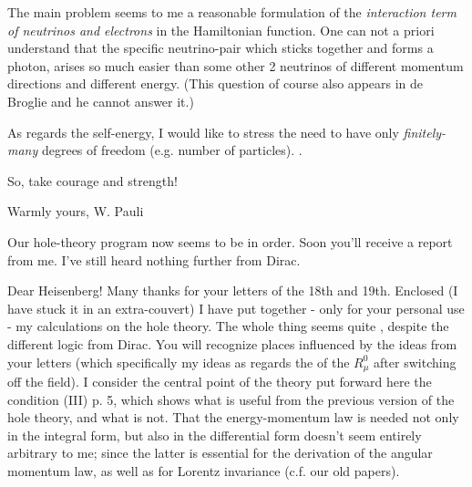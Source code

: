 \documentclass{article}
\begin{document}
The main problem seems to me  a reasonable formulation of the \textit{interaction term of neutrinos and electrons} in the Hamiltonian function. One can not a priori understand that the specific neutrino-pair which sticks together and forms a photon, arises so much easier than some other 2 neutrinos of different momentum directions and different energy. (This question of course also appears in de Broglie and he cannot answer it.)

As regards the self-energy, I would like  to stress the need to have only \textit{finitely-many} degrees of freedom (e.g. number of particles). .

So, take courage and strength!

Warmly yours, W. Pauli

Our hole-theory program now seems to be in order. Soon you'll receive a report from me. I've still heard nothing further from Dirac.

\date{January 21, 1934}

Dear Heisenberg!
Many thanks for your letters of the 18th and 19th.
Enclosed (I have stuck it in an extra-couvert) I have put together - only for your personal use - my calculations on the hole theory. The whole thing seems quite , despite the different logic from Dirac. You will recognize places influenced by the ideas from your letters (which specifically  my ideas as regards the  of the $R^0_\mu$ after switching off the field). I consider the central point of the theory put forward here the condition (III) p. 5, which shows what is useful from the previous version of the hole theory, and what is not.
That the energy-momentum law is needed not only in the integral form, but also in the differential form doesn't seem entirely arbitrary to me; since the latter is essential for the derivation of the angular momentum law, as well as for Lorentz invariance (c.f. our old papers).
\end{document}
